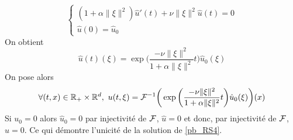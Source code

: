 \begin{equation}\label{pb_RS_Fourier}
    \begin{cases}
        (1+\alpha\|\xi\|^2)\hat{u}'(t)+\nu\|\xi\|^2\hat{u}(t) = 0  \\
        \hat{u}(0) = \hat{u}_0
    \end{cases}
\end{equation}
On obtient 
\begin{equation*}
    \hat{u}(t)(\xi) = \exp\bigg(\frac{-\nu \|\xi\|^2}{1+\alpha\|\xi\|^2}t\bigg)\hat{u}_0(\xi)
\end{equation*}
On pose alors 
\begin{equation}\label{sol_Fourier}
    \forall (t,x) \in \mathbb{R}_+\times \mathbb{R}^d, \ u(t,\xi) = \mathcal{F}^{-1}\bigg(\exp\bigg(\frac{-\nu \|\xi\|^2}{1+\alpha\|\xi\|^2}t\bigg)\hat{u}_0(\xi)\bigg)(x)
\end{equation}
Si $u_0=0$ alors $\hat{u}_0=0$ par injectivité de $\mathcal{F}$, $\hat{u}=0$ et donc, par injectivité de $\mathcal{F}$, $u=0$. Ce qui démontre l'unicité de la solution de \eqref{pb_RS4}.

